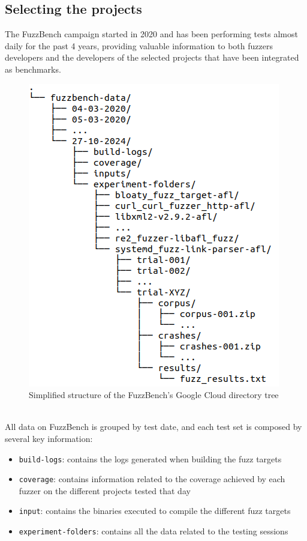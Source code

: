 \subsection{Selecting the projects}
The FuzzBench campaign started in 2020 and has been performing tests almost daily for the past 4 years, providing valuable information to both fuzzers developers and the developers of the selected projects that have been integrated as benchmarks.
\begin{figure}[h]
\centering
\includegraphics[scale=0.4]{foto/tree.png}
\caption{Simplified structure of the FuzzBench's Google Cloud directory tree}
\label{fig:tree}
\end{figure}
\ \\
All data on FuzzBench is grouped by test date, and each test set is composed by several key information:
\begin{itemize}
    \item \verb|build-logs|: contains the logs generated when building the fuzz targets
    \item \verb|coverage|: contains information related to the coverage achieved by each fuzzer on the different projects tested that day
    \item \verb|input|: contains the binaries executed to compile the different fuzz targets
    \item \verb|experiment-folders|: contains all the data related to the testing sessions
\end{itemize}

